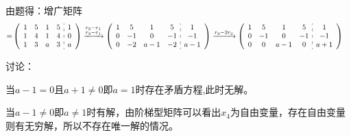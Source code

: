\documentclass[a4paper]{report}
\begin{document}
\begin{jie}
由题得：增广矩阵
\begin{align*}
[A|B]=&
\left(
 \begin{array}{c:c}
\begin{matrix}
1 & 5 & 1 &5\\
1 & 4 & 1 &4 \\
1 & 3 & a &3
\end{matrix}&
\begin{matrix}
1  \\
0  \\
a
\end{matrix}
\end{array}
\right)\xrightarrow{\substack{r_{2}-r_{1}\\ r_{3}-r_{1}}}
{
\left(
 \begin{array}{c:c}
\begin{matrix}
1 & 5 & 1 &5\\
0 & -1 & 0 &-1 \\
0 & -2 & a-1 &-2
\end{matrix}&
\begin{matrix}
1  \\
-1  \\
a-1
\end{matrix}
\end{array}
\right)
}\xrightarrow{\substack{r_{3}-2r_{2}}}
{
\left(
 \begin{array}{c:c}
\begin{matrix}
1 & 5 & 1 &5\\
0 & -1 & 0 &-1 \\
0 & 0 & a-1 &0
\end{matrix}&
\begin{matrix}
1  \\
-1  \\
a+1
\end{matrix}
\end{array}
\right)
}
\end{align*}

讨论：

当$a-1=0$且$a+1\neq 0$即$a=1$时存在矛盾方程,此时无解。

当$a-1\neq 0$即$a\neq 1$时有解，由阶梯型矩阵可以看出$x_4$为自由变量，存在自由变量则有无穷解，所以不存在唯一解的情况。


\end{jie}
\end{document}
